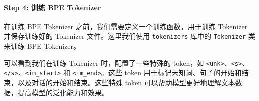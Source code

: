 \documentclass[12pt,a4paper]{book}
\begin{document}
\paragraph{Step 4: 训练 BPE
Tokenizer}\label{step-4-ux8badux7ec3-bpe-tokenizer}

在训练 BPE Tokenizer 之前，我们需要定义一个训练函数，用于训练 Tokenizer
并保存训练好的 Tokenizer 文件。这里我们使用 \texttt{tokenizers} 库中的
\texttt{Tokenizer} 类来训练 BPE Tokenizer。

可以看到我们在训练 Tokenizer 时，配置了一些特殊的 token，如
\texttt{\textless{}unk\textgreater{}}、\texttt{\textless{}s\textgreater{}}、\texttt{\textless{}/s\textgreater{}}、\texttt{\textless{}\textbar{}im\_start\textbar{}\textgreater{}}
和 \texttt{\textless{}\textbar{}im\_end\textbar{}\textgreater{}}。这些
token 用于标记未知词、句子的开始和结束，以及对话的开始和结束。这些特殊
token 可以帮助模型更好地理解文本数据，提高模型的泛化能力和效果。
\end{document}
